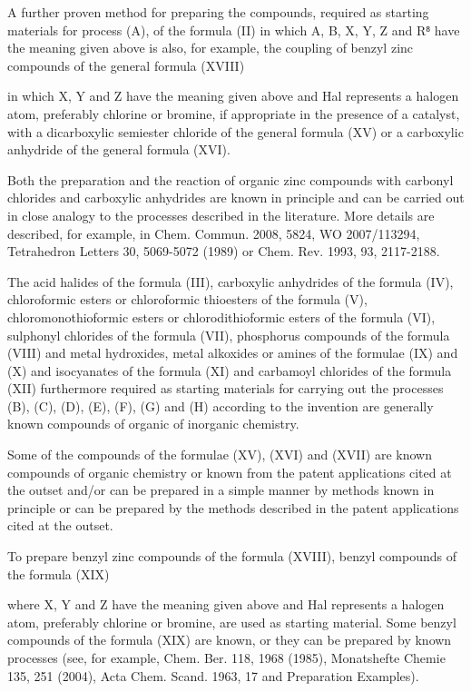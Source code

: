 \documentclass[11pt,a4paper]{article}
\begin{document}
A further proven method for preparing the compounds, required as starting materials for process (A), of the formula (II) in which A, B, X, Y, Z and R⁸ have the meaning given above is also, for example, the coupling of benzyl zinc compounds of the general formula (XVIII)

in which X, Y and Z have the meaning given above and Hal represents a halogen atom, preferably chlorine or bromine, if appropriate in the presence of a catalyst, with a dicarboxylic semiester chloride of the general formula (XV) or a carboxylic anhydride of the general formula (XVI).

Both the preparation and the reaction of organic zinc compounds with carbonyl chlorides and carboxylic anhydrides are known in principle and can be carried out in close analogy to the processes described in the literature. More details are described, for example, in Chem. Commun. 2008, 5824, WO 2007/113294, Tetrahedron Letters 30, 5069-5072 (1989) or Chem. Rev. 1993, 93, 2117-2188.

The acid halides of the formula (III), carboxylic anhydrides of the formula (IV), chloroformic esters or chloroformic thioesters of the formula (V), chloromonothioformic esters or chlorodithioformic esters of the formula (VI), sulphonyl chlorides of the formula (VII), phosphorus compounds of the formula (VIII) and metal hydroxides, metal alkoxides or amines of the formulae (IX) and (X) and isocyanates of the formula (XI) and carbamoyl chlorides of the formula (XII) furthermore required as starting materials for carrying out the processes (B), (C), (D), (E), (F), (G) and (H) according to the invention are generally known compounds of organic of inorganic chemistry.

Some of the compounds of the formulae (XV), (XVI) and (XVII) are known compounds of organic chemistry or known from the patent applications cited at the outset and/or can be prepared in a simple manner by methods known in principle or can be prepared by the methods described in the patent applications cited at the outset.

To prepare benzyl zinc compounds of the formula (XVIII), benzyl compounds of the formula (XIX)

where X, Y and Z have the meaning given above and Hal represents a halogen atom, preferably chlorine or bromine, are used as starting material. Some benzyl compounds of the formula (XIX) are known, or they can be prepared by known processes (see, for example, Chem. Ber. 118, 1968 (1985), Monatshefte Chemie 135, 251 (2004), Acta Chem. Scand. 1963, 17 and Preparation Examples).
\end{document}
